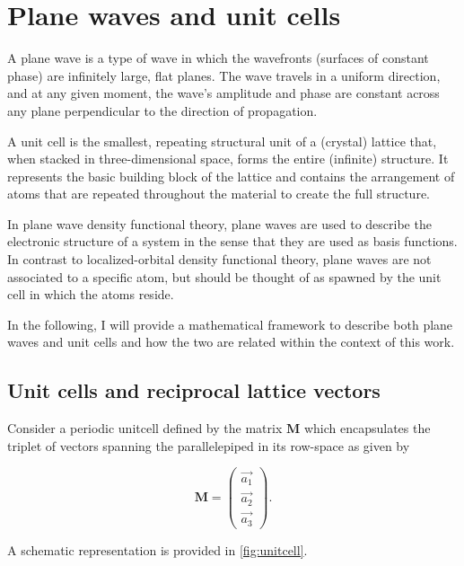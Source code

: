 %
%
%
\section{Plane waves and unit cells}

A plane wave is a type of wave in which the wavefronts (surfaces of constant phase) are infinitely large, flat planes. The wave travels in a uniform direction, and at any given moment, the wave's amplitude and phase are constant across any plane perpendicular to the direction of propagation. 

A unit cell is the smallest, repeating structural unit of a (crystal) lattice that, when stacked in three-dimensional space, forms the entire (infinite) structure. It represents the basic building block of the lattice and contains the arrangement of atoms that are repeated throughout the material to create the full structure.

In plane wave density functional theory, plane waves are used to describe the electronic structure of a system in the sense that they are used as basis functions. In contrast to localized-orbital density functional theory, plane waves are not associated to a specific atom, but should be thought of as spawned by the unit cell in which the atoms reside.

In the following, I will provide a mathematical framework to describe both plane waves and unit cells and how the two are related within the context of this work.

%
%
%
\subsection{Unit cells and reciprocal lattice vectors}

Consider a periodic unitcell defined by the matrix $\mathbf{M}$ which encapsulates the triplet of vectors spanning the parallelepiped in its row-space as given by

\begin{equation}
    \mathbf{M} = \left(
    \begin{matrix}
        \vec{a_{1}}\\
        \vec{a_{2}}\\
        \vec{a_{3}}
    \end{matrix}
    \right).
\end{equation}

A schematic representation is provided in \cref{fig:unitcell}.

\begin{Figure}
    \centering
    \resizebox{0.7 \textwidth}{!}{
        
    }
    \label{fig:unitcell}
\end{Figure}

